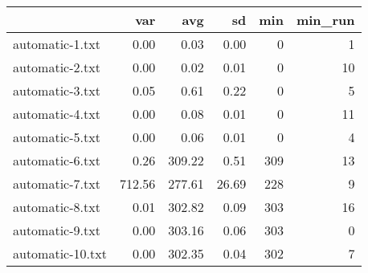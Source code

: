 \begin{tabular}{lrrrrr}
  \toprule  & var & avg & sd & min & min\_run \\ 
  \midrule automatic-1.txt & 0.00 & 0.03 & 0.00 & 0 & 1 \\ 
  automatic-2.txt & 0.00 & 0.02 & 0.01 & 0 & 10 \\ 
  automatic-3.txt & 0.05 & 0.61 & 0.22 & 0 & 5 \\ 
  automatic-4.txt & 0.00 & 0.08 & 0.01 & 0 & 11 \\ 
  automatic-5.txt & 0.00 & 0.06 & 0.01 & 0 & 4 \\ 
  automatic-6.txt & 0.26 & 309.22 & 0.51 & 309 & 13 \\ 
  automatic-7.txt & 712.56 & 277.61 & 26.69 & 228 & 9 \\ 
  automatic-8.txt & 0.01 & 302.82 & 0.09 & 303 & 16 \\ 
  automatic-9.txt & 0.00 & 303.16 & 0.06 & 303 & 0 \\ 
  automatic-10.txt & 0.00 & 302.35 & 0.04 & 302 & 7 \\ 
   \bottomrule \end{tabular}
